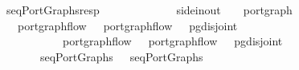 \ seqPortGraphs{\isacharunderscore}resp{\isacharcolon}\isanewline
\ \ \ \ \ \ \ \ \ \ {\isacharcolon}{\isacharcolon}\ {\isachardoublequoteopen}{\isacharparenleft}\ {\isacharcolon}{\isacharcolon}\ side{\isacharunderscore}in{\isacharunderscore}out{\isacharcomma}\ \ \ \ port{\isacharunderscore}graph{\isachardoublequoteclose}\isanewline
\ \ \ {\isachardoublequoteopen}port{\isacharunderscore}graph{\isacharunderscore}flow\ \ \ {\isachardoublequoteopen}port{\isacharunderscore}graph{\isacharunderscore}flow\ \ \ {\isachardoublequoteopen}pg{\isacharunderscore}disjoint\ \isanewline
\ \ \ \ \ \ \ \ \ \ \ {\isachardoublequoteopen}port{\isacharunderscore}graph{\isacharunderscore}flow\ \ \ {\isachardoublequoteopen}port{\isacharunderscore}graph{\isacharunderscore}flow\ \ \ {\isachardoublequoteopen}pg{\isacharunderscore}disjoint\ \isanewline
\ \ \ \ \ \ \ \ \ \ \ {\isachardoublequoteopen}\ {\isasymapprox}\ \ \ {\isachardoublequoteopen}\ {\isasymapprox}\ \isanewline
\ \ \ \ \ \ \ {\isachardoublequoteopen}seqPortGraphs\ \ {\isasymapprox}\ seqPortGraphs\ 
